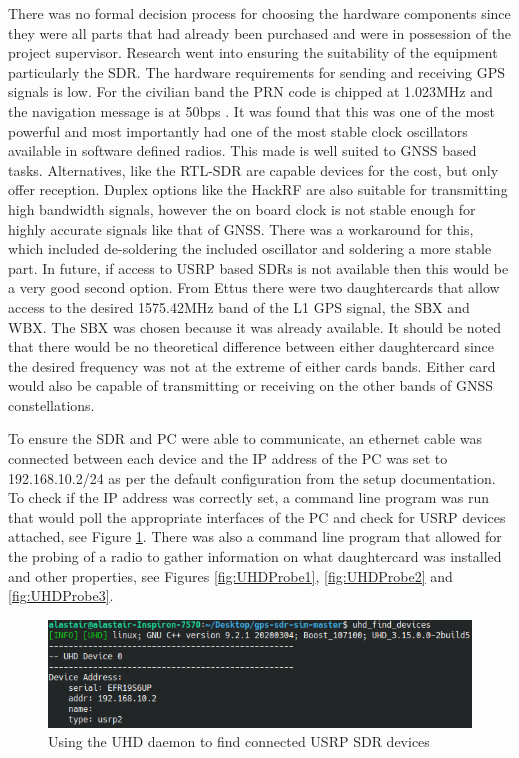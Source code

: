 There was no formal decision process for choosing the hardware components since they were all parts that had already been purchased and were in possession of the project
supervisor. Research went into ensuring the suitability of the equipment particularly the SDR. 
The hardware requirements for sending and receiving GPS signals is low. For the civilian band the PRN code is chipped at 1.023MHz and the navigation message is at 50bps \cite{RN57}.
It was found that this was one of the most powerful and most
importantly had one of the most stable clock oscillators available in software defined radios. This made is well suited to GNSS based tasks. Alternatives, like the
RTL-SDR are capable devices for the cost, but only offer reception. Duplex options like the HackRF are also suitable for transmitting high bandwidth signals, however the
on board clock is not stable enough for highly accurate signals like that of GNSS. There was a workaround for this, which included de-soldering the included oscillator
and soldering a more stable part. In future, if access to USRP based SDRs is not available then this would be a very good second option. From Ettus there were two
daughtercards that allow access to the desired 1575.42MHz band of the L1 GPS signal, the SBX and WBX. The SBX was chosen because it was already available. It should be
noted that there would be no theoretical difference between either daughtercard since the desired frequency was not at the extreme of either cards bands. Either card
would also be capable of transmitting or receiving on the other bands of GNSS constellations.

To ensure the SDR and PC were able to communicate, an ethernet cable was connected between each device and the IP address of the PC was set to 192.168.10.2/24 as per the
default configuration from the setup documentation. To check if the IP address was correctly set, a command line program was run that would poll the appropriate
interfaces of the PC and check for USRP devices attached, see Figure \ref{fig:UHDFind}. There was also a command line program that allowed for the probing of a
radio to gather information on what daughtercard was installed and other properties, see Figures \ref{fig:UHDProbe1}, \ref{fig:UHDProbe2} and \ref{fig:UHDProbe3}.

\begin{figure}[H]
    \begin{centering}
        \includegraphics[width=14cm,keepaspectratio]{Figures/uhd-find-devices.png}
        \caption{Using the UHD daemon to find connected USRP SDR devices}
    \label{fig:UHDFind}
    \end{centering}
\end{figure}

